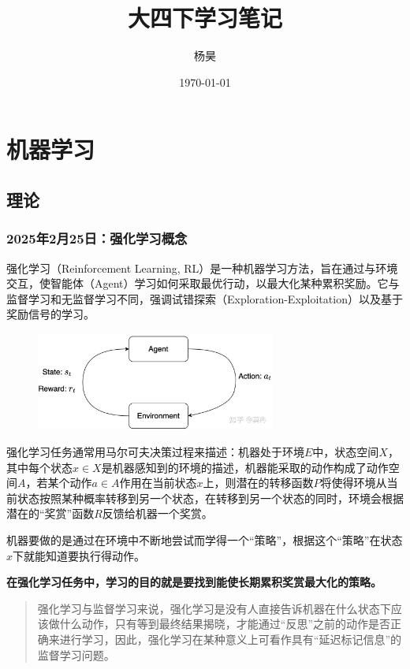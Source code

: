 \documentclass[12pt]{article}
\title{大四下学习笔记}
\author{杨昊}
\date{\today}
\begin{document}
\maketitle
\thispagestyle{empty}  %

\newpage
\tableofcontents


\newpage

\section{机器学习}


\subsection{理论}

\subsubsection{2025年2月25日：强化学习概念}
强化学习（Reinforcement Learning, RL）是一种机器学习方法，旨在通过与环境交互，使智能体（Agent）学习如何采取最优行动，以最大化某种累积奖励。它与监督学习和无监督学习不同，强调试错探索（Exploration-Exploitation）以及基于奖励信号的学习。
\begin{figure}[h]
    \centering
    \includegraphics[width=0.7\textwidth]{./images/rlimage.jpeg}  %
\end{figure}

强化学习任务通常用马尔可夫决策过程来描述：机器处于环境$E$中，状态空间$X$，其中每个状态$x \in X$是机器感知到的环境的描述，机器能采取的动作构成了动作空间$A$，若某个动作$a \in A$作用在当前状态$x$上，则潜在的转移函数$P$将使得环境从当前状态按照某种概率转移到另一个状态，在转移到另一个状态的同时，环境会根据潜在的“奖赏”函数$R$反馈给机器一个奖赏。

机器要做的是通过在环境中不断地尝试而学得一个“策略”，根据这个“策略”在状态$x$下就能知道要执行得动作。

\textbf{在强化学习任务中，学习的目的就是要找到能使长期累积奖赏最大化的策略。}
\begin{quote}
强化学习与监督学习来说，强化学习是没有人直接告诉机器在什么状态下应该做什么动作，只有等到最终结果揭晓，才能通过“反思”之前的动作是否正确来进行学习，因此，强化学习在某种意义上可看作具有“延迟标记信息”的监督学习问题。
\end{quote}
\end{document}
